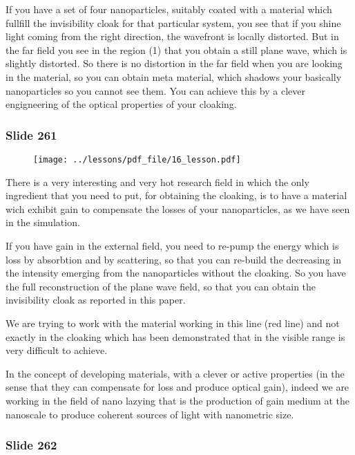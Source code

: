 \documentclass[../main/main.tex]{subfiles}
\begin{document}
If you have a set of four nanoparticles, suitably coated with a material which fullfill the invisibility cloak for that particular system, you see that if you shine light coming from the right direction, the wavefront is locally distorted. But in the far field you see in the region (1) that you obtain a still plane wave, which is slightly distorted. So there is no distortion in the far field when you are looking in the material, so you can obtain meta material, which shadows your basically nanoparticles so you cannot see them.
You can achieve this by a clever engigneering of the optical properties of your cloaking.


\newpage

\subsubsection{Slide 261}

\begin{figure}[h!]
\centering
\texttt{[image: ../lessons/pdf\_file/16\_lesson.pdf]}
\end{figure}

There is a very interesting and very hot research field in which the only ingredient that you need to put, for obtaining the cloaking, is to have a material wich exhibit gain to compensate the losses of your nanoparticles, as we have seen in the simulation.

If you have gain in the external field, you need to re-pump the energy which is loss by absorbtion and by scattering, so that you can re-build the decreasing in the intensity emerging from the nanoparticles without the cloaking. So you have the full reconstruction of the plane wave field, so that you can obtain the invisibility cloak as reported in this paper.

We are trying to work with the material working in this line (red line) and not exactly in the cloaking which has been demonstrated that in the visible range is very difficult to achieve.

In the concept of developing materials, with a clever or active properties (in the sense that they can compensate for loss and produce optical gain), indeed we are working in the field of nano lazying that is the production of gain medium at the nanoscale to produce coherent sources of light with nanometric size.

\newpage

\subsubsection{Slide 262}
\end{document}
